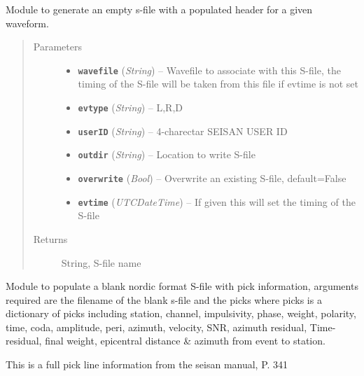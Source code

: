 \documentclass[a4paper,10pt,english]{sphinxmanual}
\begin{document}
\begin{fulllineitems}
\label{utils:Sfile_util.blanksfile}
Module to generate an empty s-file with a populated header for a given
waveform.
\begin{quote}\begin{description}
\item[{Parameters}] \leavevmode\begin{itemize}
\item {} 
\textbf{\texttt{wavefile}} (\emph{String}) -- Wavefile to associate with this S-file, the timing of the
S-file will be taken from this file if evtime is not set

\item {} 
\textbf{\texttt{evtype}} (\emph{String}) -- L,R,D

\item {} 
\textbf{\texttt{userID}} (\emph{String}) -- 4-charectar SEISAN USER ID

\item {} 
\textbf{\texttt{outdir}} (\emph{String}) -- Location to write S-file

\item {} 
\textbf{\texttt{overwrite}} (\emph{Bool}) -- Overwrite an existing S-file, default=False

\item {} 
\textbf{\texttt{evtime}} (\emph{UTCDateTime}) -- If given this will set the timing of the S-file

\end{itemize}

\item[{Returns}] \leavevmode
String, S-file name

\end{description}\end{quote}

\end{fulllineitems}


\begin{fulllineitems}
\label{utils:Sfile_util.populateSfile}
Module to populate a blank nordic format S-file with pick information,
arguments required are the filename of the blank s-file and the picks
where picks is a dictionary of picks including station, channel,
impulsivity, phase, weight, polarity, time, coda, amplitude, peri, azimuth,
velocity, SNR, azimuth residual, Time-residual, final weight,
epicentral distance \& azimuth from event to station.

This is a full pick line information from the seisan manual, P. 341

\end{fulllineitems}
\end{document}
